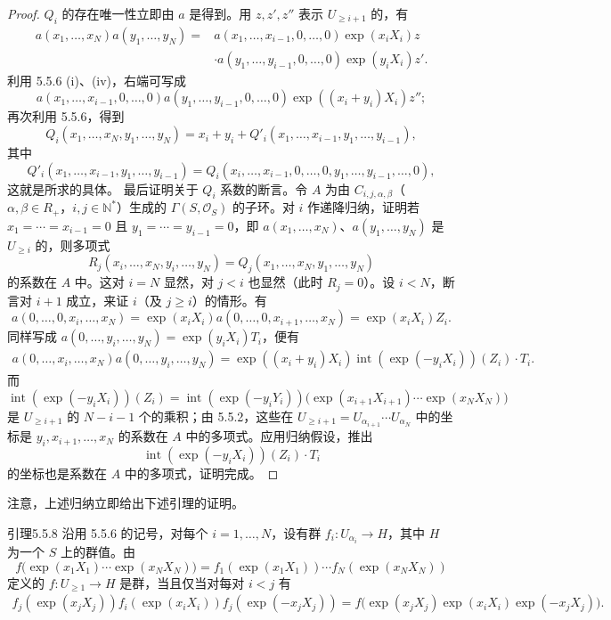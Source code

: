 \begin{proof}
$Q_i$ 的存在唯一性立即由 $a$ 是得到。用 $z,z',z''$ 表示 $U_{\ge i+1}$ 的，有
\[\begin{split}
a(x_1,\ldots,x_N)a(y_1,\ldots,y_N)
={}&a(x_1,\ldots,x_{i-1},0,\ldots,0)\exp(x_iX_i)z\\
&\cdot a(y_1,\ldots,y_{i-1},0,\ldots,0)\exp(y_iX_i)z'.
\end{split}\]
利用 5.5.6 (i)、(iv)，右端可写成
\[a(x_1,\ldots,x_{i-1},0,\ldots,0)a(y_1,\ldots,y_{i-1},0,\ldots,0)\exp((x_i+y_i)X_i)z'';\]
再次利用 5.5.6，得到
\[Q_i(x_1,\ldots,x_N,y_1,\ldots,y_N)=x_i+y_i+Q'_i(x_1,\ldots,x_{i-1},y_1,\ldots,y_{i-1}),\]
其中
\[Q'_i(x_1,\ldots,x_{i-1},y_1,\ldots,y_{i-1})
=Q_i(x_i,\ldots,x_{i-1},0,\ldots,0,y_1,\ldots,y_{i-1},\ldots,0),\]
这就是所求的具体。
最后证明关于 $Q_i$ 系数的断言。令 $A$ 为由 $C_{i,j,\alpha,\beta}$（$\alpha,\beta\in R_+$，$i,j\in\mathbb N^*$）生成的 $\Gamma(S,\mathcal O_S)$ 的子环。对 $i$ 作递降归纳，证明若 $x_1=\cdots=x_{i-1}=0$ 且 $y_1=\cdots=y_{i-1}=0$，即 $a(x_1,\ldots,x_N)$、$a(y_1,\ldots,y_N)$ 是 $U_{\ge i}$ 的，则多项式
\[R_j(x_i,\ldots,x_N,y_i,\ldots,y_N)=Q_j(x_1,\ldots,x_N,y_1,\ldots,y_N)\]
的系数在 $A$ 中。这对 $i=N$ 显然，对 $j<i$ 也显然（此时 $R_j=0$）。设 $i<N$，断言对 $i+1$ 成立，来证 $i$（及 $j\ge i$）的情形。有
\[a(0,\ldots,0,x_i,\ldots,x_N)=\exp(x_iX_i)a(0,\ldots,0,x_{i+1},\ldots,x_N)=\exp(x_iX_i)Z_i.\]
同样写成 $a(0,\ldots,y_i,\ldots,y_N)=\exp(y_iX_i)T_i$，便有
\[\begin{split}
a(0,\ldots,x_i,\ldots,x_N)a(0,\ldots,y_i,\ldots,y_N)
=\exp((x_i+y_i)X_i)\operatorname{int}(\exp(-y_iX_i))(Z_i)\cdot T_i.
\end{split}\]
而
\[\operatorname{int}(\exp(-y_iX_i))(Z_i)
=\operatorname{int}(\exp(-y_iY_i))\bigl(\exp(x_{i+1}X_{i+1})\cdots\exp(x_NX_N)\bigr)\]
是 $U_{\ge i+1}$ 的 $N-i-1$ 个的乘积；由 5.5.2，这些在 $U_{\ge i+1}=U_{\alpha_{i+1}}\cdots U_{\alpha_N}$ 中的坐标是 $y_i,x_{i+1},\ldots,x_N$ 的系数在 $A$ 中的多项式。应用归纳假设，推出
\[\operatorname{int}(\exp(-y_iX_i))(Z_i)\cdot T_i\]
的坐标也是系数在 $A$ 中的多项式，证明完成。
\end{proof}
注意，上述归纳立即给出下述引理的证明。
\begin{SGAresult}{引理}{5.5.8}
沿用 5.5.6 的记号，对每个 $i=1,\ldots,N$，设有群 $f_i:U_{\alpha_i}\to H$，其中 $H$ 为一个 $S$ 上的群值。由
\[f\bigl(\exp(x_1X_1)\cdots\exp(x_NX_N)\bigr)
=f_1(\exp(x_1X_1))\cdots f_N(\exp(x_NX_N))\]
定义的 $f:U_{\ge1}\to H$ 是群，当且仅当对每对 $i<j$ 有
\[\begin{split}
f_j(\exp(x_jX_j))f_i(\exp(x_iX_i))f_j(\exp(-x_jX_j))
=f\bigl(\exp(x_jX_j)\exp(x_iX_i)\exp(-x_jX_j)\bigr).
\end{split}\]
\end{SGAresult}
